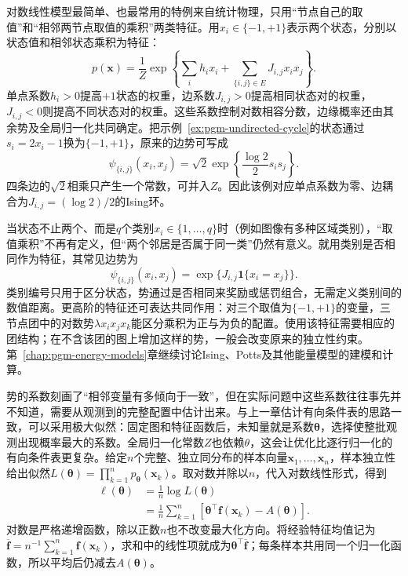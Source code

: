 对数线性模型最简单、也最常用的特例来自统计物理，只用“节点自己的取值”和“相邻两节点取值的乘积”两类特征。用$x_i\in\{-1,+1\}$表示两个状态，分别以状态值和相邻状态乘积为特征：
\begin{equation}
  p(\bm{x})=\frac{1}{Z}
  \exp\left\{\sum_i h_i x_i+
             \sum_{\{i,j\}\in E}J_{i,j}x_i x_j\right\}.
  \label{eq:pgm-undirected-ising}
\end{equation}
单点系数$h_i>0$提高$+1$状态的权重，边系数$J_{i,j}>0$提高相同状态对的权重，$J_{i,j}<0$则提高不同状态对的权重。这些系数控制对数相容分数，边缘概率还由其余势及全局归一化共同确定。把示例~\ref{ex:pgm-undirected-cycle}的状态通过$s_i=2x_i-1$换为$\{-1,+1\}$，原来的边势可写成
\[
  \psi_{\{i,j\}}(x_i,x_j)
  =\sqrt{2}\exp\left\{\frac{\log2}{2}s_i s_j\right\}.
\]
四条边的$\sqrt{2}$相乘只产生一个常数，可并入$Z$。因此该例对应单点系数为零、边耦合为$J_{i,j}=(\log2)/2$的Ising环。

当状态不止两个、而是$q$个类别$x_i\in\{1,\ldots,q\}$时（例如图像有多种区域类别），“取值乘积”不再有定义，但“两个邻居是否属于同一类”仍然有意义。就用类别是否相同作为特征，其常见边势为
\[
  \psi_{\{i,j\}}(x_i,x_j)
  =\exp\{J_{i,j}\mathbf{1}\{x_i=x_j\}\}.
\]
类别编号只用于区分状态，势通过是否相同来奖励或惩罚组合，无需定义类别间的数值距离。更高阶的特征还可表达共同作用：对三个取值为$\{-1,+1\}$的变量，三节点团中的对数势$\lambda x_i x_j x_k$能区分乘积为正与为负的配置。使用该特征需要相应的团结构；在不含该团的图上增加这样的势，一般会改变原来的独立性约束。第~\ref{chap:pgm-energy-models}章继续讨论Ising、Potts及其他能量模型的建模和计算。

势的系数刻画了“相邻变量有多倾向于一致”，但在实际问题中这些系数往往事先并不知道，需要从观测到的完整配置中估计出来。与上一章估计有向条件表的思路一致，可以采用极大似然：固定图和特征函数后，未知量就是系数$\bm{\theta}$，选择使整批观测出现概率最大的系数。全局归一化常数$Z$也依赖$\theta$，这会让优化比逐行归一化的有向条件表更复杂。给定$n$个完整、独立同分布的样本向量$\bm{x}_1,\ldots,\bm{x}_n$，样本独立性给出似然$L(\bm{\theta})=\prod_{k=1}^n p_{\bm{\theta}}(\bm{x}_k)$。取对数并除以$n$，代入对数线性形式，得到
\[
  \begin{aligned}
    \ell(\bm{\theta})
    &=\frac1n\log L(\bm{\theta})\\
    &=\frac1n\sum_{k=1}^n
       \left[\bm{\theta}^{\top}\bm{f}(\bm{x}_k)
             -A(\bm{\theta})\right].
  \end{aligned}
\]
对数是严格递增函数，除以正数$n$也不改变最大化方向。将经验特征均值记为\allowbreak$\overline{\bm{f}}=n^{-1}\sum_{k=1}^n\bm{f}(\bm{x}_k)$，求和中的线性项就成为$\bm{\theta}^{\top}\overline{\bm{f}}$；每条样本共用同一个归一化函数，所以平均后仍减去$A(\bm{\theta})$。

